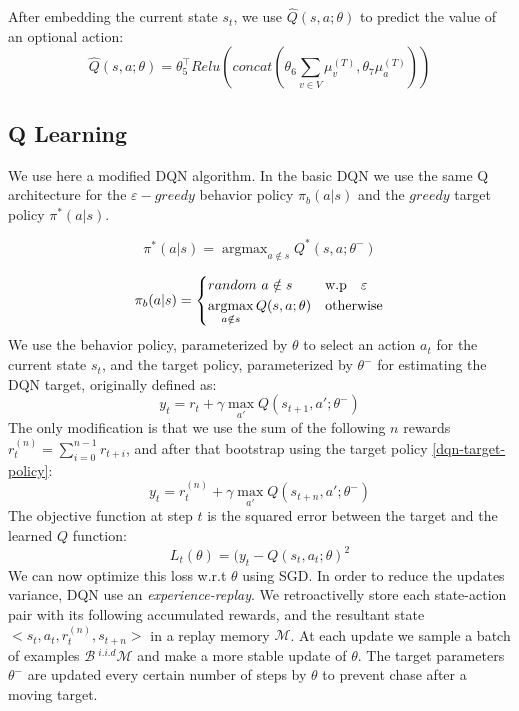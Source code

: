 \documentclass[10pt,a4paper,draft]{article}
\DeclareMathOperator*{\argmax}{argmax}
\begin{document}
After embedding the current state $s_t$, we use $\widehat{Q}(s,a;\theta)$ to predict the value of an optional action:
\begin{equation}
	\widehat{Q}(s,a;\theta) = \theta_5^\top Relu(concat(\theta_6 \sum_{v \in V} \mu_v^{(T)}, \theta_7 \mu_a^{(T)}))
\end{equation}

\subsection{Q Learning}
We use here a modified DQN algorithm. In the basic DQN we use the same Q architecture for the $\varepsilon-greedy$ behavior policy $\pi_b(a|s)$ and the $greedy$ target policy $\pi^*(a|s)$.

\begin{equation}
\pi^*(a|s) = \argmax_{a \notin s}{Q^*(s,a;\theta^-)}
\label{dqn-target-policy}
\end{equation}

\begin{equation}
\pi_b(a|s) = 
\begin{dcases}
    random \ {a \notin s} 					& \text{w.p  \ \ } \varepsilon \\
    \argmax_{a \notin s}{Q(s,a;\theta)} 	& \text{otherwise}
\end{dcases}
\label{dqn-behavior-policy}
\end{equation}
We use the behavior policy, parameterized by $\theta$ to select an action $a_t$ for the current state $s_t$, and the target policy, parameterized by $\theta^-$ for estimating the DQN target, originally defined as:
\begin{equation}
y_t = r_t + \gamma\max_{a'}Q(s_{t+1},a';\theta^-)
\label{orig-dqn-target}
\end{equation}
The only modification is that we use the sum of the following $n$ rewards $r_t^{(n)} = \sum_{i=0}^{n-1} r_{t+i}$, and after that bootstrap using the target policy \eqref{dqn-target-policy}:
\begin{equation}
y_t = r_t^{(n)} + \gamma\max_{a'}Q(s_{t+n},a';\theta^-)
\label{s2vdqn_target}
\end{equation}
The objective function at step $t$ is the squared error between the target and the learned $Q$ function:
\begin{equation}
L_t(\theta) = (y_t - Q(s_t,a_t;\theta)^2
\label{dqn_objective}
\end{equation}
We can now optimize this loss w.r.t $\theta$ using SGD. In order to reduce the updates variance, DQN use an \textit{experience-replay}. We retroactivelly store each state-action pair with its following accumulated rewards, and the resultant state $<s_t, a_t, r_t^{(n)}, s_{t+n}>$ in a replay memory $\mathcal{M}$. At each update we sample a batch of examples $\mathcal{B} ~^{i.i.d} \mathcal{M}$ and make a more stable update of $\theta$. The target parameters $\theta^-$ are updated every certain number of steps by $\theta$ to prevent chase after a moving target.
\end{document}
